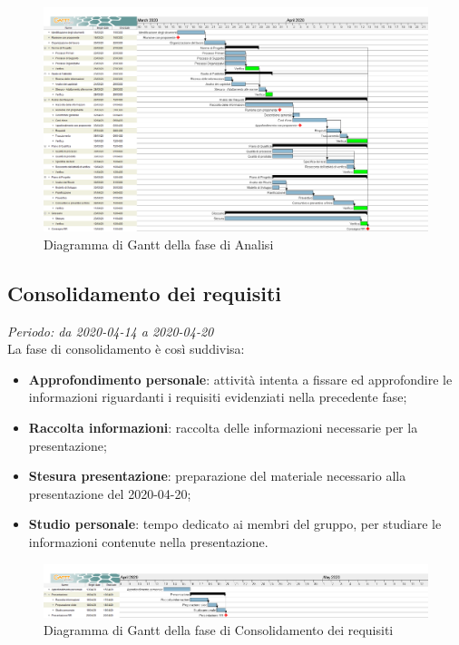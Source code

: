 \begin{figure}[H]
\centering
\includegraphics[scale=0.24]{./img/gantt/analisi.png}
\caption{Diagramma di Gantt della fase di Analisi}
\end{figure}

\subsection{Consolidamento dei requisiti}
\textit{Periodo: da 2020-04-14 a 2020-04-20}\\
La fase di consolidamento è così suddivisa:
\begin{itemize}
\item \textbf{Approfondimento personale}: attività intenta a fissare ed approfondire le informazioni riguardanti i requisiti evidenziati nella precedente fase;
\item \textbf{Raccolta informazioni}: raccolta delle informazioni necessarie per la presentazione;
\item \textbf{Stesura presentazione}: preparazione del materiale necessario alla presentazione del 2020-04-20;
\item \textbf{Studio personale}: tempo dedicato ai membri del gruppo, per studiare le informazioni contenute nella presentazione.
\end{itemize}

\begin{figure}[H]
\centering
\includegraphics[scale=0.24]{./img/gantt/consolidamento_requisiti.png}
\caption{Diagramma di Gantt della fase di Consolidamento dei requisiti}
\end{figure}

